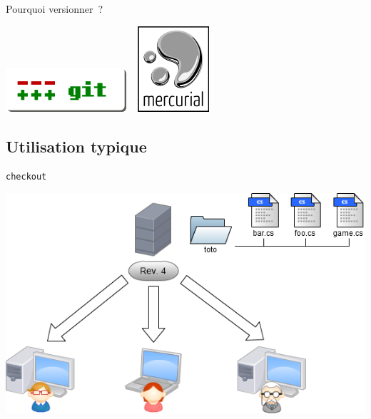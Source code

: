 \begin{frame}{Pourquoi versionner~?}
\begin{center}
{    \includegraphics[scale=0.7]{images/logo_git} ~
    \includegraphics[scale=0.6]{images/logo_hg}}
  \end{center}
\end{frame}

\subsection{Utilisation typique}

\begin{frame}
  \texttt{checkout}
  \begin{center}
    \includegraphics[scale=0.52]{images/1-CheckOut.png}
  \end{center}
\end{frame}

